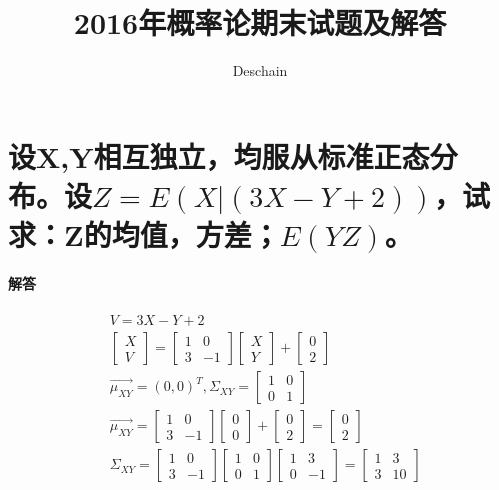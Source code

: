\documentclass[UTF8]{ctexart}
\title{2016年概率论期末试题及解答}
\author{Deschain}
\begin{document}
\maketitle
\section{设X,Y相互独立，均服从标准正态分布。设$Z=E(X\lvert(3X-Y+2))$，试求：Z的均值，方差；$E(YZ)$。}
\paragraph{解答}
\begin{equation*}
\begin{aligned}
&V=3X-Y+2\\
&\begin{bmatrix}X\\V\end{bmatrix}=\begin{bmatrix}1&0\\3&-1\end{bmatrix}\begin{bmatrix}X\\Y\end{bmatrix}+\begin{bmatrix}0\\2\end{bmatrix}\\
&\vec{\mu_{XY}}=(0,0)^T, \Sigma_{XY}=\begin{bmatrix}1&0\\0&1\end{bmatrix}\\
&\vec{\mu_{XY}}=\begin{bmatrix}1&0\\3&-1\end{bmatrix}\begin{bmatrix}0\\0\end{bmatrix}+\begin{bmatrix}0\\2\end{bmatrix}=\begin{bmatrix}0\\2\end{bmatrix}\\
&\Sigma_{XY}=\begin{bmatrix}1&0\\3&-1\end{bmatrix}\begin{bmatrix}1&0\\0&1\end{bmatrix}\begin{bmatrix}1&3\\0&-1\end{bmatrix}=\begin{bmatrix}1&3\\3&10\end{bmatrix}\\

\end{aligned}
\end{equation*}
\end{document}
